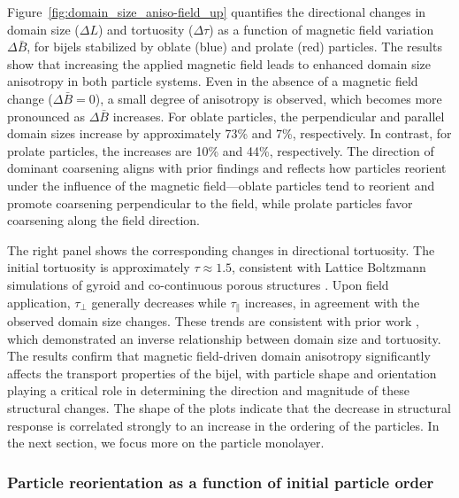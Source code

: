 Figure~\ref{fig:domain_size_aniso-field_up} quantifies the directional changes in domain size (\(\Delta L\)) and tortuosity (\(\Delta \tau\)) as a 
function of magnetic field variation \(\Delta \bar{B}\), for bijels stabilized by oblate (blue) and prolate (red) particles. The results show that 
increasing the applied magnetic field leads to enhanced domain size anisotropy in both particle systems. Even in the absence of a magnetic field 
change (\(\Delta \bar{B} = 0\)), a small degree of anisotropy is observed, which becomes more pronounced as \(\Delta \bar{B}\) increases. For oblate 
particles, the perpendicular and parallel domain sizes increase by approximately 73\% and 7\%, respectively. In contrast, for prolate particles, the 
increases are 10\% and 44\%, respectively. The direction of dominant coarsening aligns with prior findings and reflects how particles reorient under 
the influence of the magnetic field—oblate particles tend to reorient and promote coarsening perpendicular to the field, while prolate particles favor 
coarsening along the field direction.

The right panel shows the corresponding changes in directional tortuosity. The initial tortuosity is approximately \(\tau \approx 1.5\), consistent with 
Lattice Boltzmann simulations of gyroid and co-continuous porous structures \cite{luo_macroscopic_2020}. Upon field application, \(\tau_\perp\) 
generally decreases while \(\tau_\parallel\) increases, in agreement with the observed domain size changes. These trends are consistent with prior 
work \cite{karthikeyan_formation_2024}, which demonstrated an inverse relationship between domain size and tortuosity. The results confirm that 
magnetic field-driven domain anisotropy significantly affects the transport properties of the bijel, with particle shape and orientation playing a 
critical role in determining the direction and magnitude of these structural changes. The shape of the plots indicate that the decrease in structural response
is correlated strongly to an increase in the ordering of the particles. In the next section, we focus more on the particle monolayer.

\subsubsection{Particle reorientation as a function of initial particle order}

